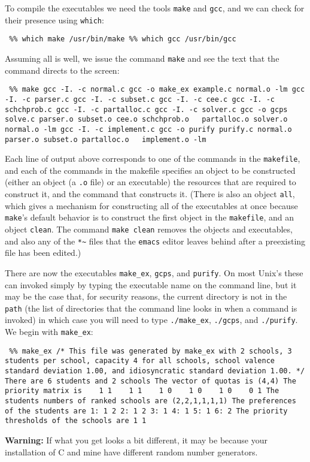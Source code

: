 \documentclass[12pt]{article}
\theoremstyle{definition}
\begin{document}
\begin{appendix}
To compile the executables we need the tools \texttt{make} and
\texttt{gcc}, and we can check for their presence using
\texttt{which}:
\begin{obeylines}
  \texttt{
    \%\% which make
    /usr/bin/make
    \%\% which gcc
    /usr/bin/gcc
    }
\end{obeylines}
\bigskip

\noindent
Assuming all is well, we issue the command \texttt{make} and see the text that the command directs to the screen:
\begin{obeylines}
  \texttt{
    \%\% make
    gcc -I. -c normal.c
    gcc -o make\_ex example.c normal.o -lm
    gcc -I. -c parser.c
    gcc -I. -c subset.c
    gcc -I. -c cee.c
    gcc -I. -c schchprob.c
    gcc -I. -c partalloc.c
    gcc -I. -c solver.c
    gcc -o gcps solve.c parser.o subset.o cee.o schchprob.o
    \ \ partalloc.o solver.o normal.o -lm
    gcc -I. -c implement.c
    gcc -o purify purify.c normal.o parser.o subset.o partalloc.o
    \ \ implement.o -lm
    }
\end{obeylines}
\bigskip
\noindent
Each line of output above corresponds to one of the commands in the
\texttt{makefile}, and each of the commands in the makefile specifies
an object to be constructed (either an object (a \texttt{.o} file) or
an executable) the resources that are required to construct it, and
the command that constructs it.  (There is also an object
\texttt{all}, which gives a mechanism for constructing all of the
executables at once because \texttt{make}'s default behavior is to
construct the first object in the \texttt{makefile}, and an object
\texttt{clean}.  The command \texttt{make clean} removes the objects
and executables, and also any of the \texttt{*\~} files that the
\texttt{emacs} editor leaves behind after a preexisting file has been
edited.)

There are now the executables \texttt{make\_ex}, \texttt{gcps}, and
\texttt{purify}.  On most Unix's these can invoked simply by typing
the executable name on the command line, but it may be the case that,
for security reasons, the current directory is not in the
\texttt{path} (the list of directories that the command line looks in
when a command is invoked) in which case you will need to type
\texttt{./make\_ex}, \texttt{./gcps}, and \texttt{./purify}.  We begin
with \texttt{make\_ex}:
\begin{obeylines}
  \texttt{
    \%\% make\_ex
    /* This file was generated by make\_ex with 2 schools, 3 students
    per school, capacity 4 for all schools, school valence standard
    deviation 1.00, and idiosyncratic standard deviation 1.00. */
There are 6 students and 2 schools
The vector of quotas is (4,4)
The priority matrix is
\ \ \     1    1
\ \ \     1    1
\ \ \     1    0
\ \ \     1    0
\ \ \     1    0
\ \ \     0    1
The students numbers of ranked schools are
(2,2,1,1,1,1)
The preferences of the students are
1:    1   2
2:    1   2
3:    1
4:    1
5:    1
6:    2
The priority thresholds of the schools are
1   1   
    }
\end{obeylines}
\bigskip
\noindent
\textbf{Warning:} If what you get looks a bit different, it may be
because your installation of C and mine have different random number
generators.


\end{appendix}
\end{document}
